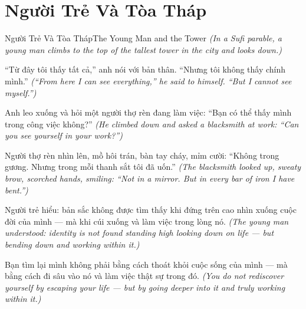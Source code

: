 \section{Người Trẻ Và Tòa Tháp}
\begin{truyen}{Người Trẻ Và Tòa Tháp}{The Young Man and the Tower}
\textit{(In a Sufi parable, a young man climbs to the top of the tallest tower in the city and looks down.)}

``Từ đây tôi thấy tất cả,'' anh nói với bản thân. ``Nhưng tôi không thấy chính mình.''
\textit{(``From here I can see everything,'' he said to himself. ``But I cannot see myself.'')}

Anh leo xuống và hỏi một người thợ rèn đang làm việc: ``Bạn có thể thấy mình trong công việc không?''
\textit{(He climbed down and asked a blacksmith at work: ``Can you see yourself in your work?'')}

Người thợ rèn nhìn lên, mồ hôi trán, bàn tay cháy, mỉm cười: ``Không trong gương. Nhưng trong mỗi thanh sắt tôi đã uốn.''
\textit{(The blacksmith looked up, sweaty brow, scorched hands, smiling: ``Not in a mirror. But in every bar of iron I have bent.'')}

Người trẻ hiểu: bản sắc không được tìm thấy khi đứng trên cao nhìn xuống cuộc đời của mình — mà khi cúi xuống và làm việc trong lòng nó.
\textit{(The young man understood: identity is not found standing high looking down on life — but bending down and working within it.)}

\end{truyen}

\begin{baihoc}
Bạn tìm lại mình không phải bằng cách thoát khỏi cuộc sống của mình — mà bằng cách đi sâu vào nó và làm việc thật sự trong đó.
\textit{(You do not rediscover yourself by escaping your life — but by going deeper into it and truly working within it.)}
\end{baihoc}
\ngancach

